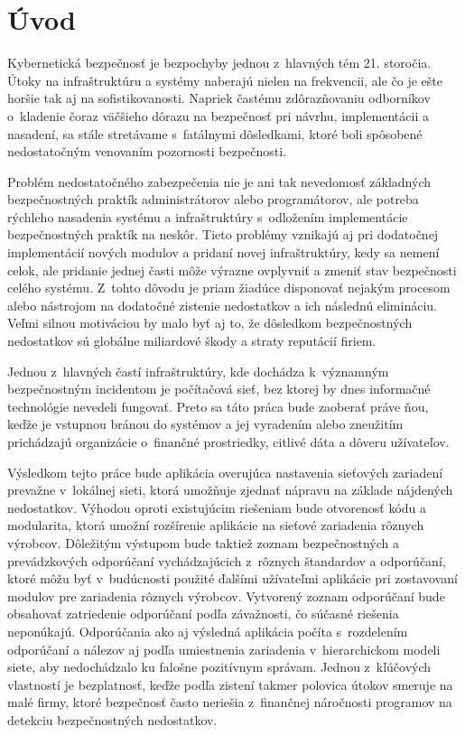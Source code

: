 \chapter*{Úvod}
{}

Kybernetická bezpečnosť je bezpochyby jednou z~hlavných tém 21. storočia. Útoky na infraštruktúru a systémy naberajú nielen na frekvencii, ale čo je ešte horšie tak aj na sofistikovanosti. Napriek častému zdôrazňovaniu odborníkov o~kladenie čoraz väčšieho dôrazu na bezpečnosť pri návrhu, implementácii a nasadení, sa stále stretávame s~fatálnymi dôsledkami, ktoré boli spôsobené nedostatočným venovaním pozornosti bezpečnosti. 

Problém nedostatočného zabezpečenia nie je ani tak nevedomosť základných bezpečnostných praktík administrátorov alebo programátorov, ale potreba rýchleho nasadenia systému a infraštruktúry s~odložením implementácie bezpečnostných praktík na neskôr. Tieto problémy vznikajú aj pri dodatočnej implementácií nových modulov a pridaní novej infraštruktúry, kedy sa nemení celok, ale pridanie jednej časti môže výrazne ovplyvniť a zmeniť stav bezpečnosti celého systému. Z~tohto dôvodu je priam žiadúce disponovať nejakým procesom alebo nástrojom na dodatočné zistenie nedostatkov a ich následnú elimináciu. Veľmi silnou motiváciou by malo byť aj to, že dôsledkom bezpečnostných nedostatkov sú globálne miliardové škody a straty reputácií firiem. 

Jednou z~hlavných častí infraštruktúry, kde dochádza k~významným bezpečnostným incidentom je počítačová sieť, bez ktorej by dnes informačné technológie nevedeli fungovať. Preto sa táto práca bude zaoberať práve ňou, keďže je vstupnou bránou do systémov a jej vyradením alebo zneužitím prichádzajú organizácie o~finančné prostriedky, citlivé dáta a dôveru užívateľov.

Výsledkom tejto práce bude aplikácia overujúca nastavenia sieťových zariadení prevažne v~lokálnej sieti, ktorá umožňuje zjednať nápravu na základe nájdených nedostatkov. Výhodou oproti existujúcim riešeniam bude otvorenosť kódu a modularita, ktorá umožní rozšírenie aplikácie na sieťové zariadenia rôznych výrobcov. Dôležitým výstupom bude taktiež zoznam bezpečnostných a prevádzkových odporúčaní vychádzajúcich z~rôznych štandardov a odporúčaní, ktoré môžu byť v~budúcnosti použité ďalšími užívateľmi aplikácie pri zostavovaní modulov pre zariadenia rôznych výrobcov. Vytvorený zoznam odporúčaní bude obsahovať zatriedenie odporúčaní podľa závažnosti, čo súčasné riešenia neponúkajú. Odporúčania ako aj výsledná aplikácia počíta s~rozdelením odporúčaní a nálezov aj podľa umiestnenia zariadenia v~hierarchickom modeli siete, aby nedochádzalo ku falošne pozitívnym správam. Jednou z~kľúčových vlastností je bezplatnosť, keďže podľa zistení takmer polovica útokov smeruje na malé firmy, ktoré bezpečnosť často neriešia z~finančnej náročnosti programov na detekciu bezpečnostných nedostatkov.    

